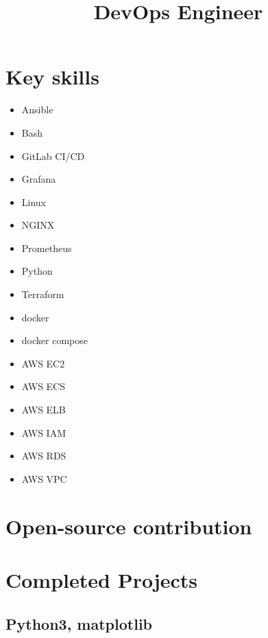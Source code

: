 \documentclass[a4paper,sans]{moderncv}
\title{DevOps Engineer}
\begin{document}
\maketitle






\section{Key skills}
\begin{multicols}{4}
  \begin{itemize}
    
  \item Ansible
  \item Bash
  \item GitLab CI/CD
  \item Grafana
  \item Linux
  \item NGINX
  \item Prometheus
  \item Python
  \item Terraform
  \item docker
  \item docker compose
    
  \item AWS EC2
  \item AWS ECS
  \item AWS ELB
  \item AWS IAM
  \item AWS RDS
  \item AWS VPC    
\end{itemize}
\end{multicols}

\section{Open-source contribution}


\section{Completed Projects}
\subsection{Python3, matplotlib}
\end{document}
